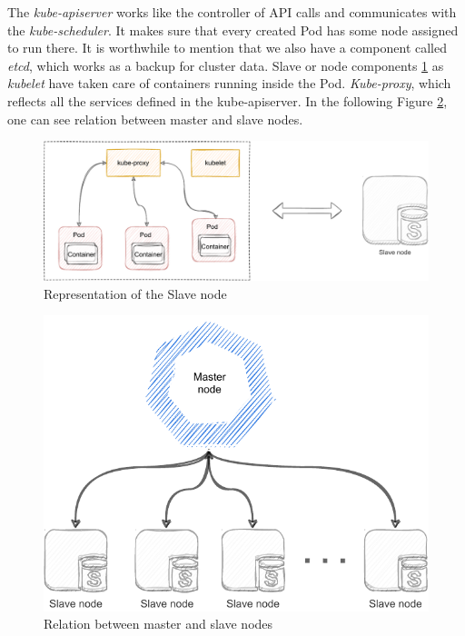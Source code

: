 The \emph{kube-apiserver} works like the controller of API calls and communicates with the \emph{kube-scheduler}. It makes sure that every created Pod has some node assigned to run there. It is worthwhile to mention that we also have a component called \emph{etcd}, which works as a backup for cluster data. Slave or node components \ref{02:fig:slaveNode} as \emph{kubelet} have taken care of containers running inside the Pod. \emph{Kube-proxy}, which reflects all the services defined in the kube-apiserver. In the following Figure \ref{02:fig:masterAndSlaveNode}, one can see relation between master and slave nodes.

\begin{figure}[!h]
    \centering
\includegraphics[scale=0.82]{obrazky-figures/02-preliminaries/01-kubernetes/02-architecture-slave-sketch.pdf}
    \caption{Representation of the Slave node}
    \label{02:fig:slaveNode}
\end{figure}


\begin{figure}[!h]
    \centering
    \includegraphics[scale=0.92]{obrazky-figures/02-preliminaries/01-kubernetes/02-final-architecture-master-slave.pdf}
    \caption{Relation between master and slave nodes}
    \label{02:fig:masterAndSlaveNode}
\end{figure}

